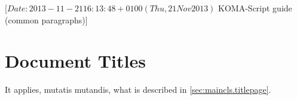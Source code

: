 %
%
%
%
%
%
%
%
% 
%
%
%
%

                 [$Date: 2013-11-21 16:13:48 +0100 (Thu, 21 Nov 2013) $
                  KOMA-Script guide (common paragraphs)]


\makeatletter
{}%
%
%
%
\makeatother

\section{Document Titles}
\label{sec:\csname label@base\endcsname.titlepage}%
\ifshortversion\IgnoreThisfalse{}\fi%
\ifIgnoreThis %
It applies, mutatis mutandis, what is described in
\autoref{sec:maincls.titlepage}.
\else %
%
%

